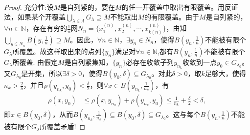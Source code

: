 \documentclass[../../main.tex]{subfiles}%
\begin{document}
\begin{proof}
{\heiti 充分性:}设$M$是自列紧的，要在$M$的任一开覆盖中取出有限覆盖。用反证法，如果某个开覆盖$\bigcup\limits_{\lambda\in\Lambda}G_\lambda\supseteq M$不能取出$M$的有限覆盖。由于$M$是自列紧的，$\forall n\in\mathbb{N}$，存在有穷的$\frac{1}{n}$网$N_n=\{x_1^{(n)},x_2^{(n)},\cdots,x_{k(n)}^{(n)}\}$，由知$\bigcup\limits_{y\in N_n}B(y,\frac{1}{n})\supseteq M$。因此，$\forall n\in\mathbb{N}$，$\exists y_n\in N_n$，使得$B(y_n,\frac{1}{n})$不能被有限个$G_\lambda$所覆盖。故这样取出来的点列$\{y_n\}$满足对$\forall n\in\mathbb{N}$,都有$B(y_n,\frac{1}{n})$不能被有限个$G_\lambda$所覆盖.
由假定$M$是自列紧集知，$\{y_n\}$必存在收敛子列$y_{n_k}$收敛到一点$y_0\in G_{\lambda_0}$。又$G_{\lambda_0}$是开集，所以$\exists\delta>0$，使得$B(y_0,\delta)\subseteq G_{\lambda_0}$。对此$\delta>0$，取$k$足够大，使得$n_k>\frac{2}{\delta}$，并且$\rho(y_{n_k},y_0)<\frac{\delta}{2}$，则$\forall x\in B(y_{n_k},\frac{1}{n_k})$，有
\begin{align*}
\rho(x,y_0)&\leqslant\rho(x,y_{n_k})+\rho(y_{n_k},y_0)\leqslant\frac{1}{n_k}+\frac{\delta}{2}<\delta,
\end{align*}
即$x\in B(y_0,\delta)$，从而$B(y_{n_k},\frac{1}{n_k})\subseteq B(y_0,\delta)\subseteq G_{\lambda_0}$。这与每个$B(y_n,\frac{1}{n})$不能被有限个$G_\lambda$所覆盖矛盾!
\end{proof}
\end{document}
